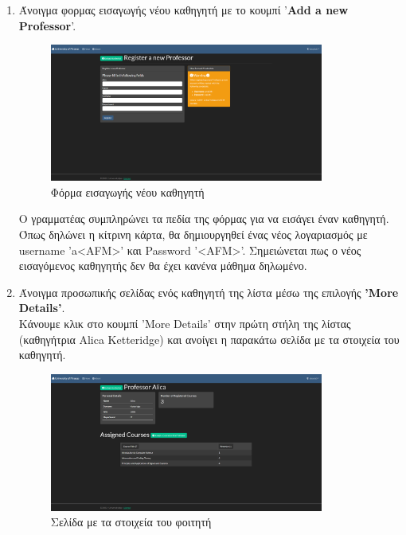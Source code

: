 \documentclass[12pt]{article}
\begin{document}
	\begin{enumerate}
		\item Άνοιγμα φορμας εισαγωγής νέου καθηγητή με το κουμπί '\textbf{Add a new Professor}'.\\
		
		\begin{figure}[H]
			\centering
			\includegraphics[width=0.85\textwidth]{addp.png}
			\caption{Φόρμα εισαγωγής νέου καθηγητή}
			\label{fig:emptyView}
		\end{figure}
		
		Ο γραμματέας συμπληρώνει τα πεδία της φόρμας για να εισάγει έναν καθηγητή. Όπως δηλώνει η κίτρινη κάρτα, θα δημιουργηθεί ένας νέος λογαριασμός με username 'a<AFM>' και Password '<AFM>'. Σημειώνεται πως ο νέος εισαγόμενος καθηγητής δεν θα έχει κανένα μάθημα δηλωμένο.
		
		\item Άνοιγμα προσωπικής σελίδας ενός καθηγητή της λίστα μέσω της επιλογής \textbf{'More Details'}.\\
		Κάνουμε κλικ στο κουμπί 'More Details' στην πρώτη στήλη της λίστας (καθηγήτρια Alica Ketteridge) και ανοίγει η παρακάτω σελίδα με τα στοιχεία του καθηγητή.
		
		
		\begin{figure}[H]
			\centering
			\includegraphics[width=0.85\textwidth]{dp.png}
			\caption{Σελίδα με τα στοιχεία του φοιτητή}
			\label{fig:emptyView}
		\end{figure}
		

\end{enumerate}
\end{document}
